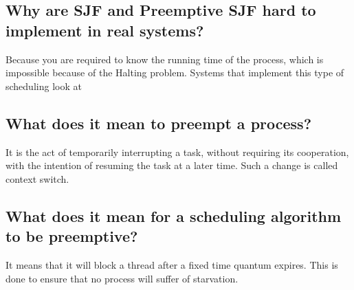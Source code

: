 \documentclass[a4paper]{article}
\begin{document}
\subsection{Why are SJF and Preemptive SJF hard to implement in real systems?} %
\label{sub:Why are SJF and Preemptive SJF hard to implement in real systems?}
Because you are required to know the running time of the process, which is impossible because of the Halting problem.
Systems that implement this type of scheduling look at 
\subsection{What does it mean to preempt a process?} %
\label{sub:What does it mean to preempt a process?}
It is the act of temporarily interrupting a task, without requiring its cooperation, with the intention of resuming the task at a later time. Such a change is called context switch.
\subsection{What does it mean for a scheduling algorithm to be preemptive?} %
\label{sub:What does it mean for a scheduling algorithm to be preemptive?}
It means that it will block a thread after a fixed time quantum expires. This is done to ensure that no process will suffer of
starvation.
\end{document}

